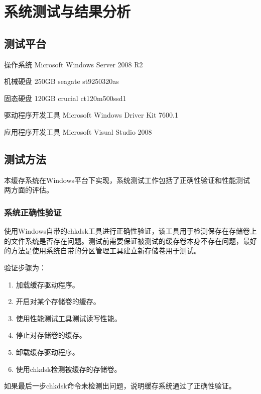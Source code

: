 
\chapter{系统测试与结果分析}
\label{cha:exp_analysis}

\section{测试平台}
\label{sec:exp_platform}

操作系统 Microsoft Windows Server 2008 R2

机械硬盘 250GB seagate st9250320as

固态硬盘 120GB crucial ct120m500ssd1

驱动程序开发工具 Microsoft Windows Driver Kit 7600.1

应用程序开发工具 Microsoft Visual Studio 2008

\section{测试方法}
\label{sec:exp_method}

本缓存系统在Windows平台下实现，系统测试工作包括了正确性验证和性能测试两方面的评估。

\subsection{系统正确性验证}

使用Windows自带的chkdsk工具进行正确性验证，该工具用于检测保存在存储卷上的文件系统是否存在问题。测试前需要保证被测试的缓存卷本身不存在问题，最好的方法是使用系统自带的分区管理工具建立新存储卷用于测试。

验证步骤为：
\begin{enumerate}
\item 加载缓存驱动程序。
\item 开启对某个存储卷的缓存。
\item 使用性能测试工具测试读写性能。
\item 停止对存储卷的缓存。
\item 卸载缓存驱动程序。
\item 使用chkdsk检测被缓存的存储卷。
\end{enumerate}

如果最后一步chkdsk命令未检测出问题，说明缓存系统通过了正确性验证。


